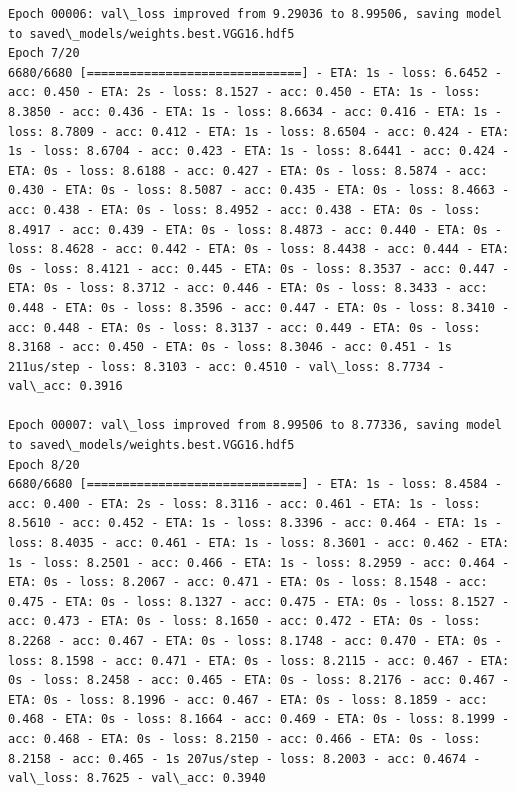 \documentclass[11pt]{article}
\begin{document}
\begin{Verbatim}[commandchars=\\\{\}]
Epoch 00006: val\_loss improved from 9.29036 to 8.99506, saving model to saved\_models/weights.best.VGG16.hdf5
Epoch 7/20
6680/6680 [==============================] - ETA: 1s - loss: 6.6452 - acc: 0.450 - ETA: 2s - loss: 8.1527 - acc: 0.450 - ETA: 1s - loss: 8.3850 - acc: 0.436 - ETA: 1s - loss: 8.6634 - acc: 0.416 - ETA: 1s - loss: 8.7809 - acc: 0.412 - ETA: 1s - loss: 8.6504 - acc: 0.424 - ETA: 1s - loss: 8.6704 - acc: 0.423 - ETA: 1s - loss: 8.6441 - acc: 0.424 - ETA: 0s - loss: 8.6188 - acc: 0.427 - ETA: 0s - loss: 8.5874 - acc: 0.430 - ETA: 0s - loss: 8.5087 - acc: 0.435 - ETA: 0s - loss: 8.4663 - acc: 0.438 - ETA: 0s - loss: 8.4952 - acc: 0.438 - ETA: 0s - loss: 8.4917 - acc: 0.439 - ETA: 0s - loss: 8.4873 - acc: 0.440 - ETA: 0s - loss: 8.4628 - acc: 0.442 - ETA: 0s - loss: 8.4438 - acc: 0.444 - ETA: 0s - loss: 8.4121 - acc: 0.445 - ETA: 0s - loss: 8.3537 - acc: 0.447 - ETA: 0s - loss: 8.3712 - acc: 0.446 - ETA: 0s - loss: 8.3433 - acc: 0.448 - ETA: 0s - loss: 8.3596 - acc: 0.447 - ETA: 0s - loss: 8.3410 - acc: 0.448 - ETA: 0s - loss: 8.3137 - acc: 0.449 - ETA: 0s - loss: 8.3168 - acc: 0.450 - ETA: 0s - loss: 8.3046 - acc: 0.451 - 1s 211us/step - loss: 8.3103 - acc: 0.4510 - val\_loss: 8.7734 - val\_acc: 0.3916

Epoch 00007: val\_loss improved from 8.99506 to 8.77336, saving model to saved\_models/weights.best.VGG16.hdf5
Epoch 8/20
6680/6680 [==============================] - ETA: 1s - loss: 8.4584 - acc: 0.400 - ETA: 2s - loss: 8.3116 - acc: 0.461 - ETA: 1s - loss: 8.5610 - acc: 0.452 - ETA: 1s - loss: 8.3396 - acc: 0.464 - ETA: 1s - loss: 8.4035 - acc: 0.461 - ETA: 1s - loss: 8.3601 - acc: 0.462 - ETA: 1s - loss: 8.2501 - acc: 0.466 - ETA: 1s - loss: 8.2959 - acc: 0.464 - ETA: 0s - loss: 8.2067 - acc: 0.471 - ETA: 0s - loss: 8.1548 - acc: 0.475 - ETA: 0s - loss: 8.1327 - acc: 0.475 - ETA: 0s - loss: 8.1527 - acc: 0.473 - ETA: 0s - loss: 8.1650 - acc: 0.472 - ETA: 0s - loss: 8.2268 - acc: 0.467 - ETA: 0s - loss: 8.1748 - acc: 0.470 - ETA: 0s - loss: 8.1598 - acc: 0.471 - ETA: 0s - loss: 8.2115 - acc: 0.467 - ETA: 0s - loss: 8.2458 - acc: 0.465 - ETA: 0s - loss: 8.2176 - acc: 0.467 - ETA: 0s - loss: 8.1996 - acc: 0.467 - ETA: 0s - loss: 8.1859 - acc: 0.468 - ETA: 0s - loss: 8.1664 - acc: 0.469 - ETA: 0s - loss: 8.1999 - acc: 0.468 - ETA: 0s - loss: 8.2150 - acc: 0.466 - ETA: 0s - loss: 8.2158 - acc: 0.465 - 1s 207us/step - loss: 8.2003 - acc: 0.4674 - val\_loss: 8.7625 - val\_acc: 0.3940


\end{Verbatim}
\end{document}
